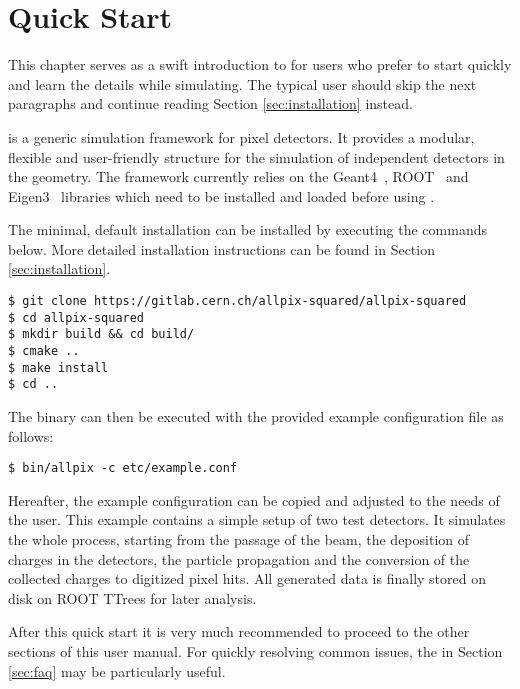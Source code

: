 \section{Quick Start}
This chapter serves as a swift introduction to \apsq for users who prefer to start quickly and learn the details while simulating.
The typical user should skip the next paragraphs and continue reading Section \ref{sec:installation} instead. 

\apsq is a generic simulation framework for pixel detectors.
It provides a modular, flexible and user-friendly structure for the simulation of independent detectors in the geometry.
The framework currently relies on the Geant4~\cite{geant4}, ROOT~\cite{root} and Eigen3~\cite{eigen3} libraries which need to be installed and loaded before using \apsq.

The minimal, default installation can be installed by executing the commands below.
More detailed installation instructions can be found in Section \ref{sec:installation}.

\begin{verbatim}
$ git clone https://gitlab.cern.ch/allpix-squared/allpix-squared
$ cd allpix-squared
$ mkdir build && cd build/
$ cmake ..
$ make install
$ cd ..
\end{verbatim}
The binary can then be executed with the provided example configuration file as follows:
\begin{verbatim}
$ bin/allpix -c etc/example.conf
\end{verbatim}

Hereafter, the example configuration can be copied and adjusted to the needs of the user.
This example contains a simple setup of two test detectors.
It simulates the whole process, starting from the passage of the beam, the deposition of charges in the detectors, the particle propagation and the conversion of the collected charges to digitized pixel hits.
All generated data is finally stored on disk on ROOT TTrees for later analysis.

After this quick start it is very much recommended to proceed to the other sections of this user manual.
For quickly resolving common issues, the  in Section \ref{sec:faq} may be particularly useful.
